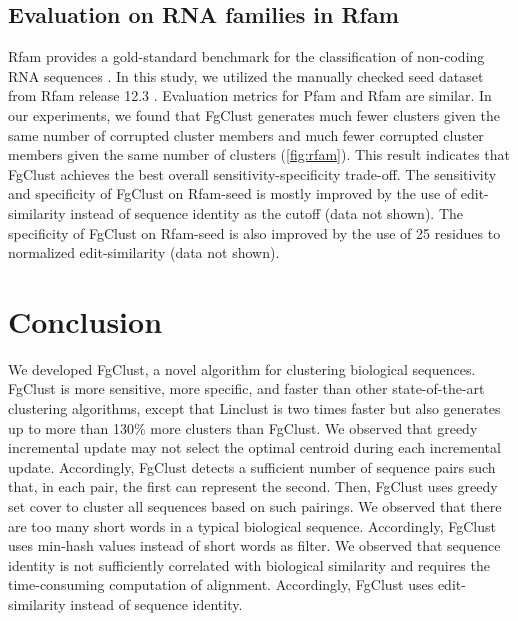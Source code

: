 \documentclass[11pt,letterpaper]{article}
\begin{document}
\subsection{Evaluation on RNA families in Rfam}

Rfam provides a gold-standard benchmark for the classification of non-coding RNA sequences \citep{nawrocki2014rfam}.
In this study, we utilized the manually checked seed dataset from Rfam release 12.3 \citep{nawrocki2014rfam}.
Evaluation metrics for Pfam and Rfam are similar.
In our experiments, we found that FgClust generates much fewer clusters given the same number of corrupted cluster members and much fewer corrupted cluster members given the same number of clusters (\cref{fig:rfam}).
This result indicates that FgClust achieves the best overall sensitivity-specificity trade-off.
The sensitivity and specificity of FgClust on Rfam-seed is mostly improved by the use of edit-similarity instead of sequence identity as the cutoff (data not shown).
The specificity of FgClust on Rfam-seed is also improved by the use of 25 residues to normalized edit-similarity (data not shown).

\section{Conclusion}

We developed FgClust, a novel algorithm for clustering biological sequences.
FgClust is more sensitive, more specific, and faster than other state-of-the-art clustering algorithms, except that Linclust is two times faster but also generates up to more than 130\% more clusters than FgClust.
We observed that greedy incremental update may not select the optimal centroid during each incremental update.
Accordingly, FgClust detects a sufficient number of sequence pairs such that, in each pair, the first can represent the second.
Then, FgClust uses greedy set cover to cluster all sequences based on such pairings.
We observed that there are too many short words in a typical biological sequence.
Accordingly, FgClust uses min-hash values instead of short words as filter.
We observed that sequence identity is not sufficiently correlated with biological similarity and requires the time-consuming computation of alignment.
Accordingly, FgClust uses edit-similarity instead of sequence identity.
\end{document}
